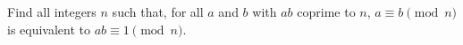 Find all integers $n$ such that, for all $a$ and $b$ with $ab$ coprime to $n$, $a \equiv b \pmod{n}$ is equivalent to $ab \equiv 1 \pmod{n}$.
